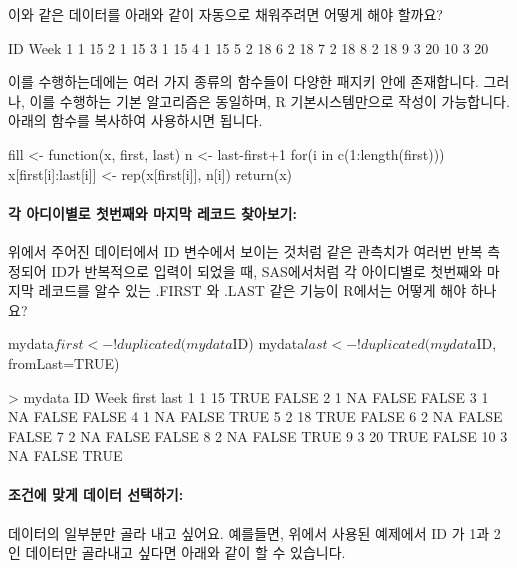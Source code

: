 \documentclass{report}
\begin{document}
이와 같은 데이터를 아래와 같이 자동으로 채워주려면 어떻게 해야 할까요? 	
	
\begin{Schunk}
\begin{Soutput}
   ID Week
1   1   15
2   1   15
3   1   15
4   1   15
5   2   18
6   2   18
7   2   18
8   2   18
9   3   20
10  3   20
\end{Soutput}
\end{Schunk}
	

이를 수행하는데에는 여러 가지 종류의 함수들이 다양한 패지키 안에 존재합니다.  
그러나, 이를 수행하는 기본 알고리즘은 동일하며, R 기본시스템만으로 작성이 가능합니다. 
아래의 함수를 복사하여 사용하시면 됩니다. 

\begin{Schunk}
	\begin{Soutput}
fill <- function(x, first, last){
	n <- last-first+1
	for(i in c(1:length(first))) x[first[i]:last[i]] <- rep(x[first[i]], n[i])
	return(x)
}
	\end{Soutput}
\end{Schunk}


\paragraph{각 아디이별로 첫번째와 마지막 레코드 찾아보기: } 위에서 주어진 데이터에서 ID 변수에서 보이는 것처럼 같은 관측치가 여러번 반복 측정되어 ID가 반복적으로 입력이 되었을 때, SAS에서처럼 각 아이디별로 첫번째와 마지막 레코드를 알수 있는 .FIRST 와 .LAST 같은 기능이 R에서는 어떻게 해야 하나요?

\begin{Schunk}
\begin{Soutput}
mydata$first <- !duplicated(mydata$ID)
mydata$last <- !duplicated(mydata$ID, fromLast=TRUE)		

> mydata
   ID Week first  last
1   1   15  TRUE FALSE
2   1   NA FALSE FALSE
3   1   NA FALSE FALSE
4   1   NA FALSE  TRUE
5   2   18  TRUE FALSE
6   2   NA FALSE FALSE
7   2   NA FALSE FALSE
8   2   NA FALSE  TRUE
9   3   20  TRUE FALSE
10  3   NA FALSE  TRUE
	\end{Soutput}	
\end{Schunk}

\paragraph{조건에 맞게 데이터 선택하기:} 데이터의 일부분만 골라 내고 싶어요.  예를들면, 위에서 사용된 예제에서 ID 가 1과 2인 데이터만 골라내고 싶다면 아래와 같이 할 수 있습니다. 
\end{document}
